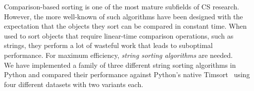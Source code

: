 \begin{multicols}{2}
\sffamily
\small 
Comparison-based sorting is one of the most mature subfields of CS research.
However, the more well-known of such algorithms have been designed with the
expectation that the objects they sort can be compared in constant time.
When used to sort objects that require linear-time comparison operations,
such as strings, they perform a lot of wasteful work that leads to suboptimal
performance. For maximum efficiency, \emph{string sorting algorithms} are
needed.\\

We have implemented a family of three different string sorting algorithms in
Python and compared their performance against Python's native Timsort~\cite{p2002} using
four different datasets with two variants each.\\
\end{multicols}
